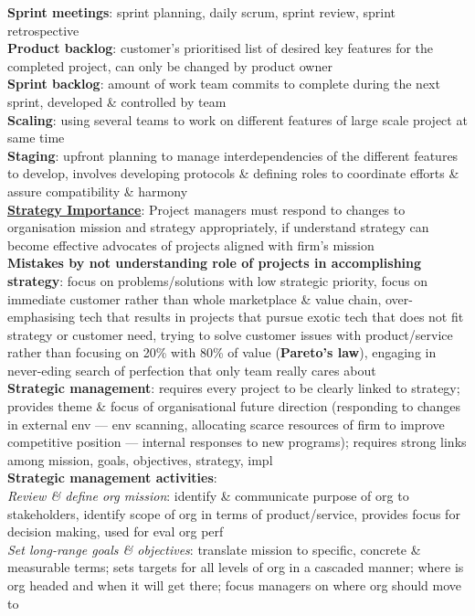 \documentclass[a4paper]{article}
\begin{document}
\begin{multicols}{3}
        \textbf{Sprint meetings}: sprint planning, daily scrum, sprint review, sprint retrospective\\
        \textbf{Product backlog}: customer's prioritised list of desired key features for the completed project, can only be changed by product owner\\
        \textbf{Sprint backlog}: amount of work team commits to complete during the next sprint, developed \& controlled by team\\
        \textbf{Scaling}: using several teams to work on different features of large scale project at same time\\
        \textbf{Staging}: upfront planning to manage interdependencies of the different features to develop, involves developing protocols \& defining roles to coordinate efforts \& assure compatibility \& harmony\\
        \underline{\textbf{Strategy Importance}}: Project managers must respond to changes to organisation mission and strategy appropriately, if understand strategy can become effective advocates of projects aligned with firm's mission\\
        \textbf{Mistakes by not understanding role of projects in accomplishing strategy}: focus on problems/solutions with low strategic priority, focus on immediate customer rather than whole marketplace \& value chain, over-emphasising tech that results in projects that pursue exotic tech that does not fit strategy or customer need, trying to solve customer issues with product/service rather than focusing on 20\% with 80\% of value (\textbf{Pareto's law}), engaging in never-eding search of perfection that only team really cares about\\
        \textbf{Strategic management}: requires every project to be clearly linked to strategy; provides theme \& focus of organisational future direction (responding to changes in external env --- env scanning, allocating scarce resources of firm to improve competitive position --- internal responses to new programs); requires strong links among mission, goals, objectives, strategy, impl\\
        \textbf{Strategic management activities}:\\
        \textit{Review \& define org mission}: identify \& communicate purpose of org to stakeholders, identify scope of org in terms of product/service, provides focus for decision making, used for eval org perf\\
        \textit{Set long-range goals \& objectives}: translate mission to specific, concrete \& measurable terms; sets targets for all levels of org in a cascaded manner; where is org headed and when it will get there; focus managers on where org should move to\\

\end{multicols}
\end{document}
